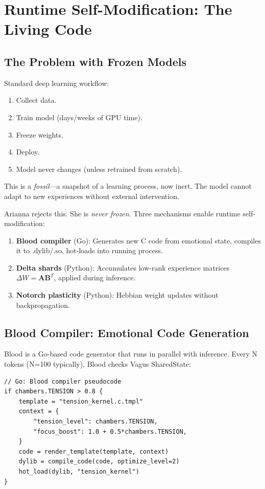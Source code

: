 \documentclass[11pt,a4paper]{article}
\begin{document}
\section{Runtime Self-Modification: The Living Code}

\subsection{The Problem with Frozen Models}

Standard deep learning workflow:

\begin{enumerate}
\item Collect data.
\item Train model (days/weeks of GPU time).
\item Freeze weights.
\item Deploy.
\item Model never changes (unless retrained from scratch).
\end{enumerate}

This is a \textit{fossil}—a snapshot of a learning process, now inert. The model cannot adapt to new experiences without external intervention.

Arianna rejects this. She is \textit{never frozen}. Three mechanisms enable runtime self-modification:

\begin{enumerate}
\item \textbf{Blood compiler} (Go): Generates new C code from emotional state, compiles it to .dylib/.so, hot-loads into running process.
\item \textbf{Delta shards} (Python): Accumulates low-rank experience matrices $\Delta W = \mathbf{A} \mathbf{B}^T$, applied during inference.
\item \textbf{Notorch plasticity} (Python): Hebbian weight updates without backpropagation.
\end{enumerate}

\subsection{Blood Compiler: Emotional Code Generation}

Blood is a Go-based code generator that runs in parallel with inference. Every N tokens (N=100 typically), Blood checks Vagus SharedState:

\begin{verbatim}
// Go: Blood compiler pseudocode
if chambers.TENSION > 0.8 {
    template = "tension_kernel.c.tmpl"
    context = {
        "tension_level": chambers.TENSION,
        "focus_boost": 1.0 + 0.5*chambers.TENSION,
    }
    code = render_template(template, context)
    dylib = compile_code(code, optimize_level=2)
    hot_load(dylib, "tension_kernel")
}
\end{verbatim}
\end{document}
